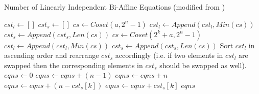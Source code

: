 \begin{algorithm}[ht!] %
\caption{Number of Linearly Independent Bi-Affine Equations (modified from \cite{Nawaz09-1})} 
\label{alg:biaffineNumber}
\begin{algorithmic}[1]
	\State $cst_l \gets []$
	\State $cst_s \gets []$
	\State $cs \gets Coset(a, 2^n - 1)$ %
	\State $cst_l \gets Append(cst_l, Min(cs))$
	\State $cst_s \gets Append(cst_s, Len(cs))$
		\State $cs \gets Coset(2^k + a, 2^n - 1)$ %
		\State $cst_l \gets Append(cst_l, Min(cs))$
		\State $cst_s \gets Append(cst_s, Len(cs))$
	\EndFor
	\State Sort $cst_l$ in ascending order and rearrange $cst_s$ accordingly (i.e. if two elements in $cst_l$ are swapped then the
	corresponding elements in $cst_s$ should be swapped as well).
	\State $eqns \gets 0$
			\State $eqns \gets eqns + (n - 1)$
			\State $eqns \gets eqns + n$
		\Else
				\State $eqns \gets eqns + (n - cst_s[k])$
			\EndIf
				\State $eqns \gets eqns + cst_s[k]$
			\EndIf
		\EndIf	
	\EndFor
	\State \Return $eqns$
\end{algorithmic}
\end{algorithm}

